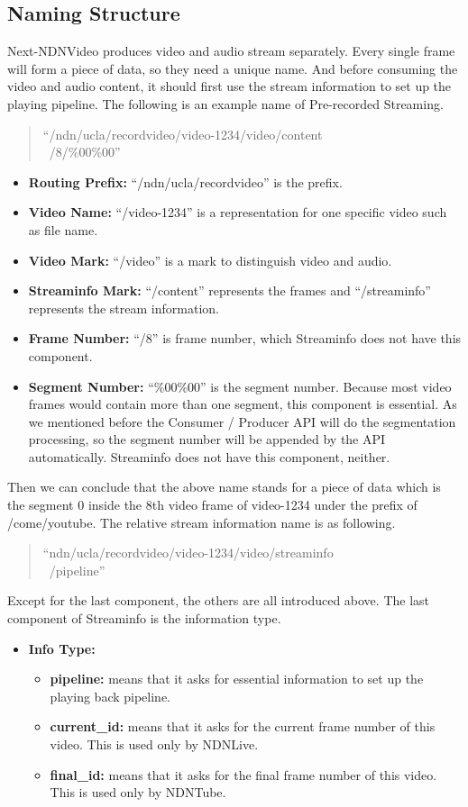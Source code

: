 \subsection{Naming Structure}
Next-NDNVideo produces video and audio stream separately. Every single frame will form a piece of data, so they need a unique name. And before consuming the video and audio content, it should first use the stream information to set up the playing pipeline. The following is an example name of Pre-recorded Streaming. 
\begin{quote}
``/ndn/ucla/recordvideo/video-1234/video/content \\\ /8/\%00\%00''
\end{quote}
\begin{itemize}
	\item{\textbf{Routing Prefix:}} ``/ndn/ucla/recordvideo'' is the prefix.
	\item{\textbf{Video Name:}} ``/video-1234'' is a representation for one specific video such as file name.
	\item{\textbf{Video Mark:}} ``/video'' is a mark to distinguish video and audio.
	\item{\textbf{Streaminfo Mark:}} ``/content'' represents the frames and ``/streaminfo'' represents the stream information.
	\item{\textbf{Frame Number:}} ``/8'' is frame number, which Streaminfo does not have this component.
	\item{\textbf{Segment Number:}} ``\%00\%00'' is the segment number. Because most video frames would contain more than one segment, this component is essential. As we mentioned before the Consumer / Producer API will do the segmentation processing, so the segment number will be appended by the API automatically. Streaminfo does not have this component, neither.
\end{itemize}

Then we can conclude that the above name stands for a piece of data which is the segment 0 inside the 8th video frame of video-1234 under the prefix of /come/youtube. The relative stream information name is as following.
\begin{quote}
``ndn/ucla/recordvideo/video-1234/video/streaminfo \\\ /pipeline''
\end{quote}

Except for the last component, the others are all introduced above. The last component of Streaminfo is the information type.
\begin{itemize}
	\item{\textbf{Info Type:}} 
	\begin{itemize}
		\item{\textbf{pipeline:}} means that it asks for essential information to set up the playing back pipeline. 
		\item{\textbf{current\_id:}} means that it asks for the current frame number of this video. This is used only by NDNLive.
		\item{\textbf{final\_id:}} means that it asks for the final frame number of this video. This is used only by NDNTube. 
	\end{itemize}
\end{itemize}



